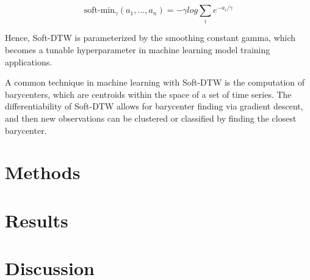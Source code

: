 \documentclass[11pt, letterpaper]{article}
\begin{document}
$$\text{soft-min}_\gamma(a_1,...,a_n) = -\gamma log\sum_{i}e^{-a_i/\gamma}$$

Hence, Soft-DTW is parameterized by the smoothing constant gamma, which becomes
a tunable hyperparameter in machine learning model training applications.

A common technique in machine learning with Soft-DTW is the computation of
barycenters, which are centroids within the space of a set of time series. The
differentiability of Soft-DTW allows for barycenter finding via gradient
descent, and then new observations can be clustered or classified by finding the
closest barycenter.

\section{Methods}

\section{Results}

\section{Discussion}

\printbibliography[]
\end{document}
